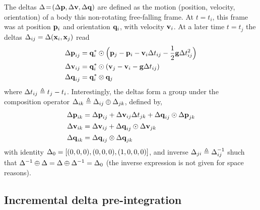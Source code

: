 The deltas $\Delta\!=\!({\Delta{\bf p}},{\Delta{\bf v}},{\Delta{\bf q}})$ are defined as the motion (position, velocity, orientation) of a body \wrt this non-rotating free-falling frame. At $t=t_i$, this frame was at position ${\bf p}_i$ and orientation ${\bf q}_i$, with velocity ${\bf v}_i$. At a later time $t=t_j$ the deltas $\Delta_{ij}=\Delta({\bf x}_i,{\bf x}_j)$ read
%
\begin{align}\label{equ:delta_definition}
\begin{split}
{\Delta{\bf p}}_{ij} &= {\bf q}_i^*\odot\Big({\bf p}_j - {\bf p}_i - {\bf v}_i\Delta t_{ij} - \frac12{\bf g}\Delta t_{ij}^2\Big) \\
{\Delta{\bf v}}_{ij} &= {\bf q}_i^*\odot({\bf v}_j - {\bf v}_i - {\bf g}\Delta t_{ij}) \\
{\Delta{\bf q}}_{ij} &= {\bf q}_i^*\otimes{\bf q}_j 
\end{split}
\end{align}
%
where $\Delta t_{ij} \triangleq t_j - t_i$. Interestingly, the deltas form a group under the composition operator $\Delta_{ik}\triangleq\Delta_{ij}\oplus\Delta_{jk}$, defined by,
%
\begin{align} \label{equ:g_composition}
\begin{split}
{\Delta{\bf p}}_{ik} 
&= {\Delta{\bf p}}_{ij} + {\Delta{\bf v}}_{ij}\Delta t_{jk} + {\Delta{\bf q}}_{ij}\odot{\Delta{\bf p}}_{jk} \\
{\Delta{\bf v}}_{ik} 
&= {\Delta{\bf v}}_{ij} + {\Delta{\bf q}}_{ij}\odot{\Delta{\bf v}}_{jk} \\
{\Delta{\bf q}}_{ik} 
&= {\Delta{\bf q}}_{ij}\otimes{\Delta{\bf q}}_{jk} 
\end{split}
\end{align}
%
with identity $\Delta_0=[(0,0,0),(0,0,0),(1,0,0,0)]$, and inverse $\Delta_{ji}\triangleq\Delta_{ij}^{-1}$ shuch that $\Delta^{-1}\oplus\Delta=\Delta\oplus\Delta^{-1}=\Delta_0$ (the inverse expression is not given for space reasons).


\subsection{Incremental delta pre-integration}

